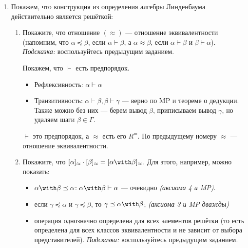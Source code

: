 \begin{enumerate}
\begin{proof}
              \begin{itemize}
                  \item Рефлексивность: \(aR^{*}a \Leftarrow aRa\), что выполнено по рефлексивности \(R\)
                  \item Антисимметричность: \(aR^{*}b, bR^{*}a \Rightarrow aRb, bRa \Rightarrow a, b\in [a]_{R^{ =}}\) и \(\in [b]_{R^{ =}}\), но классы эквивалентности не пересекаются \( \Rightarrow a = b\).
                  \item Транзитивность: по транзитивности \(R\).
              \end{itemize}
          \end{proof}

    \item Покажем, что конструкция из определения алгебры Линденбаума действительно является решёткой:
          \begin{enumerate}[wide, labelwidth=!, labelindent=0pt]
              \item Покажите, что отношение $(\approx)$ --- отношение эквивалентности (напомним, что $\alpha\preceq\beta$, если $\alpha\vdash\beta$, а $\alpha\approx\beta$, если
                    $\alpha\vdash\beta$ и $\beta\vdash\alpha$). \emph{Подсказка:} воспользуйтесь предыдущим заданием.

                    Покажем, что \(\vdash\) есть предпорядок.

                    \begin{itemize}
                        \item Рефлексивность: \(\alpha \vdash \alpha\)
                        \item Транзитивность: \(\alpha \vdash \beta, \beta \vdash \gamma\) --- верно по MP и теореме о дедукции. Также можно без них --- берем вывод \(\beta\), приписываем вывод \(\gamma\), но удаляем шаги \(\beta\in\Gamma\).
                    \end{itemize}

                    \(\vdash\) это предпорядок, а \(\approx\) есть его \(R^{ =}\). По предыдущему номеру \(\approx\) --- отношение эквивалентности.

              \item Покажите, что $[\alpha]_\approx\cdot[\beta]_\approx = [\alpha\with\beta]_\approx$. Для этого, например, можно показать:
                    \begin{itemize}
                        \item $\alpha\with\beta \preceq \alpha$: \(\alpha \with \beta \vdash \alpha\) --- очевидно \textit{(аксиома 4 и MP)}.
                        \item если $\gamma \preceq \alpha$ и $\gamma\preceq\beta$, то $\gamma\preceq\alpha\with\beta$; \textit{(аксиома 3 и MP дважды)}
                        \item операция однозначно определена для всех элементов решётки (то есть определена для всех классов
                              эквивалентности и не зависит от выбора представителей). \emph{Подсказка:} воспользуйтесь предыдущим заданием.


\end{itemize}
\end{enumerate}
\end{enumerate}
